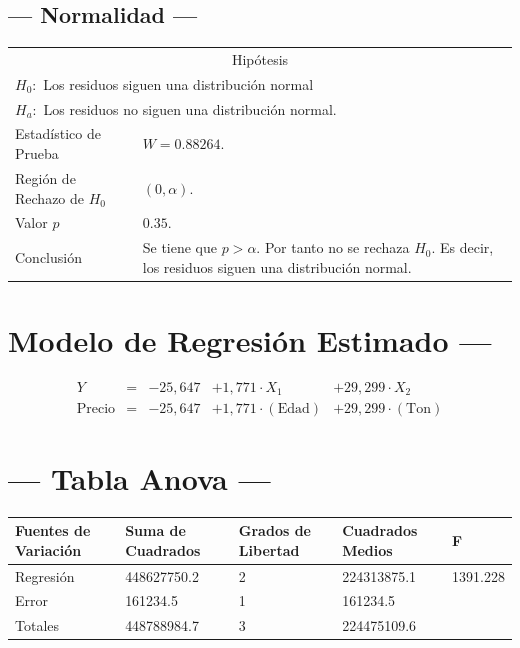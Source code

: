 \documentclass{article}
\begin{document}
\subsection{--- Normalidad ---} %
\begin{center}
  \begin{tabular}{|l|p{8cm}|}
    \cline{1-2}
    \multicolumn{2}{|c|}{Hipótesis}\\ \cline{1-2}
    \multicolumn{2}{|l|}{\(H_0:\) Los residuos siguen una distribución normal} \\ 
    \multicolumn{2}{|l|}{\(H_a:\) Los residuos no siguen una distribución normal.} \\ \cline{1-2}
    Estadístico de Prueba & \(W = 0.88264\).\\ \cline{1-2} 
		Región de Rechazo de \(H_0\) & \((0, \alpha )\).\\ \cline{1-2} 
    Valor \(p\) & \(0.35\).\\ \cline{1-2} 
    Conclusión & Se tiene que \(p> \alpha\). \newline 
		Por tanto no se rechaza \(H_0\). \newline 
		Es decir, los residuos siguen una distribución normal.\\ \cline{1-2} 
  \end{tabular}
\end{center}


\newpage

\section{\centering Modelo de Regresión Estimado ---} %
\begin{align}
	Y & = &              -25,647 & + 1,771 \cdot X_1           & + 29,299   \cdot X_2   \\[2mm]
	\mbox{Precio} & = &  -25,647 & + 1,771 \cdot (\mbox{Edad}) & + 29,299   \cdot (\mbox{Ton})
	\label{eq:1}
\end{align}

\section{\centering --- Tabla Anova ---} %
\begin{center}
  \begin{tabular}{|l|l|l|l|l|}
    \hline 
    Fuentes de Variación  & Suma de Cuadrados & Grados de Libertad & Cuadrados Medios & F\\ \hline 
Regresión  &  448627750.2         &  2     & 224313875.1 &1391.228 \\ \hline
Error      &     161234.5         &  1     &    161234.5 &  \\ \hline
Totales    &  448788984.7         &  3     & 224475109.6 &  \\ \hline
  \end{tabular}
\end{center} 
\end{document}

